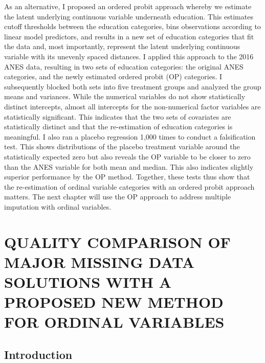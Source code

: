 \documentclass[12pt,econ]{sources/authesis}
\begin{document}
As an alternative, I proposed an ordered probit approach whereby we estimate the latent underlying continuous variable underneath education. This estimates cutoff thresholds between the education categories, bins observations according to linear model predictors, and results in a new set of education categories that fit the data and, most importantly, represent the latent underlying continuous variable with its unevenly spaced distances. I applied this approach to the 2016 ANES data, resulting in two sets of education categories: the original ANES categories, and the newly estimated ordered probit (OP) categories. I subsequently blocked both sets into five treatment groups and analyzed the group means and variances. While the numerical variables do not show statistically distinct intercepts, almost all intercepts for the non-numerical factor variables are statistically significant. This indicates that the two sets of covariates are statistically distinct and that the re-estimation of education categories is meaningful. I also ran a placebo regression 1,000 times to conduct a falsification test. This shows distributions of the placebo treatment variable around the statistically expected zero but also reveals the OP variable to be closer to zero than the ANES variable for both mean and median. This also indicates slightly superior performance by the OP method. Together, these tests thus show that the re-estimation of ordinal variable categories with an ordered probit approach matters. The next chapter will use the OP approach to address multiple imputation with ordinal variables.

\hypertarget{ordmiss}{%
\chapter{QUALITY COMPARISON OF MAJOR MISSING DATA SOLUTIONS WITH A PROPOSED NEW METHOD FOR ORDINAL VARIABLES}\label{ordmiss}}

\hypertarget{ordmiss-intro}{%
\section{Introduction}\label{ordmiss-intro}}
\end{document}
